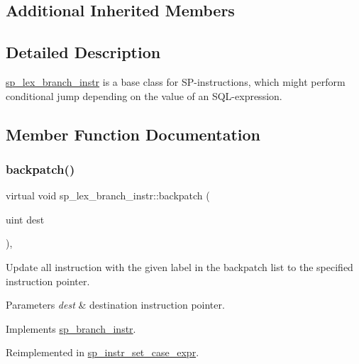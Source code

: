 \subsection*{Additional Inherited Members}


\subsection{Detailed Description}
\mbox{\hyperlink{classsp__lex__branch__instr}{sp\+\_\+lex\+\_\+branch\+\_\+instr}} is a base class for SP-\/instructions, which might perform conditional jump depending on the value of an S\+QL-\/expression. 

\subsection{Member Function Documentation}
\mbox{\label{classsp__lex__branch__instr_a0a28016e4c51d49eb9ff014b0afa7703}} 
\subsubsection{\texorpdfstring{backpatch()}{backpatch()}}
{\footnotesize\ttfamily virtual void sp\+\_\+lex\+\_\+branch\+\_\+instr\+::backpatch (\begin{DoxyParamCaption}\item[{uint}]{dest }\end{DoxyParamCaption})\hspace{0.3cm}{\ttfamily [inline]}, {\ttfamily [virtual]}}

Update all instruction with the given label in the backpatch list to the specified instruction pointer.


\begin{DoxyParams}{Parameters}
{\em dest} & destination instruction pointer. \\
\hline
\end{DoxyParams}


Implements \mbox{\hyperlink{classsp__branch__instr_a10bd06254e30634e367405f0fba5ab0d}{sp\+\_\+branch\+\_\+instr}}.



Reimplemented in \mbox{\hyperlink{classsp__instr__set__case__expr_a5d4c9c2460d84b449e5796186407b7b4}{sp\+\_\+instr\+\_\+set\+\_\+case\+\_\+expr}}.

